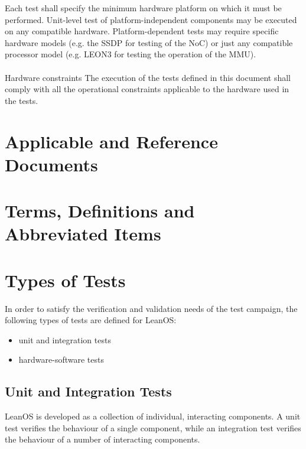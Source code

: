 Each test shall specify the minimum hardware platform on which it must be
performed. Unit-level test of platform-independent components may be executed
on any compatible hardware. Platform-dependent tests may require specific
hardware models (e.g. the \gls{SSDP} for testing of the \gls{NoC}) or just any
compatible processor model (e.g. \gls{LEON3} for testing the operation of the
\gls{MMU}).\\
\\

 {Hardware constraints}{%
The execution of the tests defined in this document shall comply with all %
the operational constraints applicable to the hardware used in the tests.%
}{}



\chapter{Applicable and Reference Documents} %

\printbibliography[heading=none]


\chapter{Terms, Definitions and Abbreviated Items}
\printglossary[type=acronym]
\printglossary[type=main, style=altlist]


\chapter{Types of Tests}

In order to satisfy the verification and validation needs of the test campaign,
the following types of tests are defined for LeanOS:
\begin{itemize}
	\item unit and integration tests
	\item hardware-software tests
\end{itemize}


\section {Unit and Integration Tests}

LeanOS is developed as a collection of individual, interacting components.
A unit test verifies the behaviour of a single component, while an integration
test verifies the behaviour of a number of interacting components. \\

